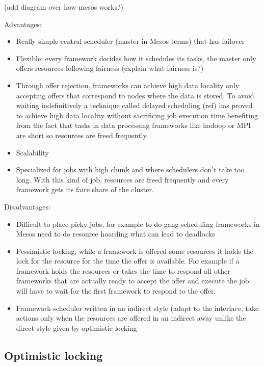 \documentclass{svjour3}                     %
\begin{document}
(add diagram over how mesos works?)

Advantages:

\begin{itemize}
  \item
  Really simple central scheduler (master in Mesos terms) that has
  failover 
 \item
  Flexible: every framework decides how it schedules its tasks, the
  master only offers resources following fairness (explain what fairness is?)
 \item
  Through offer rejection, frameworks can achieve high data locality
  only accepting offers that correspond to nodes where the data is
  stored. To avoid waiting indefinitively a technique called delayed
  scheduling (ref) has proved to achieve high data locality without
  sacrificing job execution time benefiting from the fact that tasks in
  data processing frameworks like hadoop or MPI are short so resources
  are freed frequently.
 \item Scalability
 \item Specialized for jobs with high chunk and where schedulers don't take
too long. With this kind of job, resources are freed frequently and
every framework gets its faire share of the cluster.
\end{itemize}

Disadvantages:

\begin{itemize}
 \item Difficult to place picky jobs, for example to do gang scheduling
frameworks in Mesos need to do resource hoarding what can lead to
deadlocks
 \item Pessimistic locking, while a framework is offered some resources it
holds the lock for the resource for the time the offer is
available. For example if a framework holds the resources or takes the
time to respond all other frameworks that are actually ready to accept
the offer and execute the job will have to wait for the first
framework to respond to the offer.
 \item Framework scheduler written in an indirect style (adapt to the interface, 
  take actions only when the resources are offered in an indirect away unlike
  the direct style given by optimistic locking
\end{itemize}

\subsection{Optimistic locking}
\end{document}
